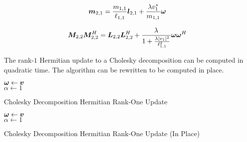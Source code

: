 \begin{appendices}
\begin{equation}
\bm{m}_{2,1} = \frac{m_{1,1}}{\ell_{1,1}} \bm{l}_{2,1} + \frac{\lambda v_1^{*}}{m_{1,1}}\bm{\omega}
\end{equation}

\begin{equation}
\bm{M}_{2,2}\bm{M}_{2,2}^H = \bm{L}_{2,2}\bm{L}_{2,2}^H + \frac{\lambda}{1 + \frac{\lambda |v_1|^2}{\ell_{1,1}^2}}\bm{\omega}\bm{\omega}^H
\end{equation}

The rank-$1$ Hermitian update to a Cholesky decomposition can be computed in quadratic time. The algorithm can be rewritten to be computed in place.

\begin{algorithm}[H]
\SetAlgoLined
   $\bm{\omega} \leftarrow \bm{v}$ \\
   $\alpha \leftarrow 1$ \\
 \caption{Cholesky Decomposition Hermitian Rank-One Update}
\end{algorithm} 




\begin{algorithm}[H]
\SetAlgoLined
   $\bm{\omega} \leftarrow \bm{v}$ \\
   $\alpha \leftarrow 1$ \\
 \caption{Cholesky Decomposition Hermitian Rank-One Update (In Place)}
\end{algorithm} 





\end{appendices}
